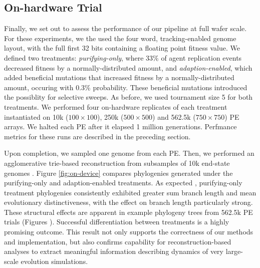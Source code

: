 \subsection{On-hardware Trial}



Finally, we set out to assess the performance of our pipeline at full wafer scale.
For these experiments, we the used the four word, tracking-enabled genome layout, with the full first 32 bits containing a floating point fitness value.
We defined two treatments: \textit{purifying-only}, where 33\% of agent replication events decreased fitness by a normally-distributed amount,  and \textit{adaption-enabled}, which added beneficial mutations that increased fitness by a normally-distributed amount, occuring with 0.3\% probability.
These beneficial mutations introduced the possiblity for selective sweeps.
As before, we used tournament size 5 for both treatments.
We performed four on-hardware replicates of each treatment instantiated on 10k ($100\times100$), 250k ($500\times500$) and 562.5k ($750\times750$) PE arrays.
We halted each PE after it elapsed 1 million generations.
Perfmance metrics for these runs are described in the preceding section.

Upon completion, we sampled one genome from each PE.
Then, we performed an agglomerative trie-based reconstruction from subsamples of 10k end-state genomes \citep{moreno2024analysis}.
Figure \ref{fig:on-device} compares phylogenies generated under the purifying-only and adaption-enabled treatments.
As expected \citep{moreno2023toward}, purifying-only treatment phylogenies consistently exhibited greater sum branch length and mean evolutionary distinctiveness, with the effect on branch length particularly strong.
These structural effects are apparent in example phylogeny trees from 562.5k PE trials (Figures ).
Successful differentiation between treatments is a highly promising outcome.
This result not only supports the correctness of our methods and implementation, but also confirms capability for reconstruction-based analyses to extract meaningful information describing dynamics of very large-scale evolution simulations.
